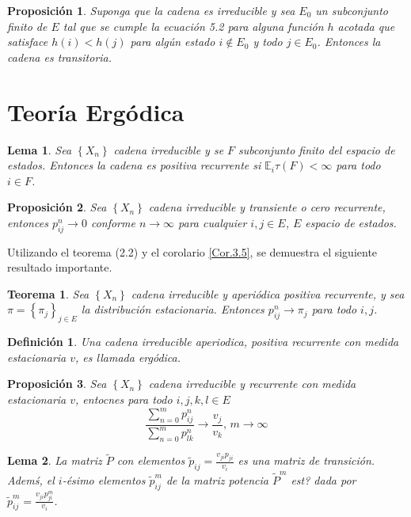 \documentclass{article}
\newtheorem{Def}{Definición}
\newtheorem{Teo}{Teorema}
\newtheorem{Prop}{Proposición}
\newtheorem{Lema}{Lema}
\newcommand{\esp}{\mathbb{E}}
\begin{document}
\begin{Prop}\label{Prop.5.4}
Suponga que la cadena es irreducible y sea $E_{0}$ un subconjunto finito de $E$ tal que se cumple la ecuaci\'on 5.2 para alguna funci\'on $h$ acotada que satisface $h\left(i\right)<h\left(j\right)$ para alg\'un estado $i\notin E_{0}$ y todo $j\in E_{0}$. Entonces la cadena es transitoria.
\end{Prop}

%
\section{Teor\'ia Erg\'odica}
%
\begin{Lema}
Sea $\left\{X_{n}\right\}$ cadena irreducible y se $F$ subconjunto finito del espacio de estados. Entonces la cadena es positiva recurrente si $\esp_{i}\tau\left(F\right)<\infty$ para todo $i\in F$.
\end{Lema}

\begin{Prop}
Sea $\left\{X_{n}\right\}$ cadena irreducible y transiente o cero recurrente, entonces $p_{ij}^{n}\rightarrow0$ conforme $n\rightarrow\infty$ para cualquier $i,j\in E$, $E$ espacio de estados.
\end{Prop}
Utilizando el teorema (2.2) y el corolario \ref{Cor.3.5}, se demuestra el siguiente resultado importante.

\begin{Teo}
Sea $\left\{X_{n}\right\}$ cadena irreducible y aperi\'odica positiva recurrente, y sea $\pi=\left\{\pi_{j}\right\}_{j\in E}$ la distribuci\'on estacionaria. Entonces $p_{ij}^{n}\rightarrow\pi_{j}$ para todo $i,j$.
\end{Teo}
\begin{Def}\label{Def.Ergodicidad}
Una cadena irreducible aperiodica, positiva recurrente con medida estacionaria $v$, es llamada {\em erg\'odica}.
\end{Def}

\begin{Prop}\label{Prop.4.4}
Sea $\left\{X_{n}\right\}$ cadena irreducible y recurrente con medida estacionaria $v$, entocnes para todo $i,j,k,l\in E$
\begin{equation}
\frac{\sum_{n=0}^{m}p_{ij}^{n}}{\sum_{n=0}^{m}p_{lk}^{n}}\rightarrow\frac{v_{j}}{v_{k}}\textrm{,    }m\rightarrow\infty
\end{equation}
\end{Prop}
\begin{Lema}\label{Lema.4.5}
La matriz $\widetilde{P}$ con elementos $\widetilde{p}_{ij}=\frac{v_{ji}p_{ji}}{v_{i}}$ es una matriz de transici\'on. Adem\'s, el $i$-\'esimo elementos $\widetilde{p}_{ij}^{m}$ de la matriz potencia $\widetilde{P}^{m}$ est? dada por $\widetilde{p}_{ij}^{m}=\frac{v_{ji}p_{ji}^{m}}{v_{i}}$.
\end{Lema}
\end{document}
